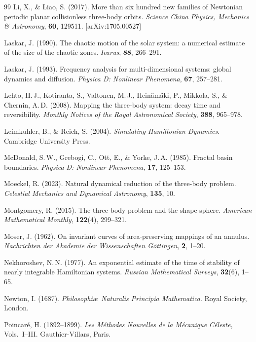 \documentclass[11pt,a4paper]{article}
\begin{document}
\begin{thebibliography}{99}
Li, X., \& Liao, S. (2017).
More than six hundred new families of Newtonian periodic planar collisionless three-body orbits.
\textit{Science China Physics, Mechanics \& Astronomy}, \textbf{60}, 129511.
[arXiv:1705.00527]

Laskar, J. (1990).
The chaotic motion of the solar system: a numerical estimate of the size of the chaotic zones.
\textit{Icarus}, \textbf{88}, 266--291.

Laskar, J. (1993).
Frequency analysis for multi-dimensional systems: global dynamics and diffusion.
\textit{Physica D: Nonlinear Phenomena}, \textbf{67}, 257--281.

Lehto, H.\,J., Kotiranta, S., Valtonen, M.\,J., Heinäm\"{a}ki, P., Mikkola, S., \& Chernin, A.\,D. (2008).
Mapping the three-body system: decay time and reversibility.
\textit{Monthly Notices of the Royal Astronomical Society}, \textbf{388}, 965--978.

Leimkuhler, B., \& Reich, S. (2004).
\textit{Simulating Hamiltonian Dynamics}.
Cambridge University Press.

McDonald, S.\,W., Grebogi, C., Ott, E., \& Yorke, J.\,A. (1985).
Fractal basin boundaries.
\textit{Physica D: Nonlinear Phenomena}, \textbf{17}, 125--153.

Moeckel, R. (2023).
Natural dynamical reduction of the three-body problem.
\textit{Celestial Mechanics and Dynamical Astronomy}, \textbf{135}, 10.

Montgomery, R. (2015).
The three-body problem and the shape sphere.
\textit{American Mathematical Monthly}, \textbf{122}(4), 299--321.

Moser, J. (1962).
On invariant curves of area-preserving mappings of an annulus.
\textit{Nachrichten der Akademie der Wissenschaften G\"{o}ttingen}, \textbf{2}, 1--20.

Nekhoroshev, N.\,N. (1977).
An exponential estimate of the time of stability of nearly integrable Hamiltonian systems.
\textit{Russian Mathematical Surveys}, \textbf{32}(6), 1--65.

Newton, I. (1687).
\textit{Philosophi\ae\ Naturalis Principia Mathematica}.
Royal Society, London.

Poincar\'{e}, H. (1892--1899).
\textit{Les M\'{e}thodes Nouvelles de la M\'{e}canique C\'{e}leste}, Vols.\ I--III.
Gauthier-Villars, Paris.


\end{thebibliography}
\end{document}
